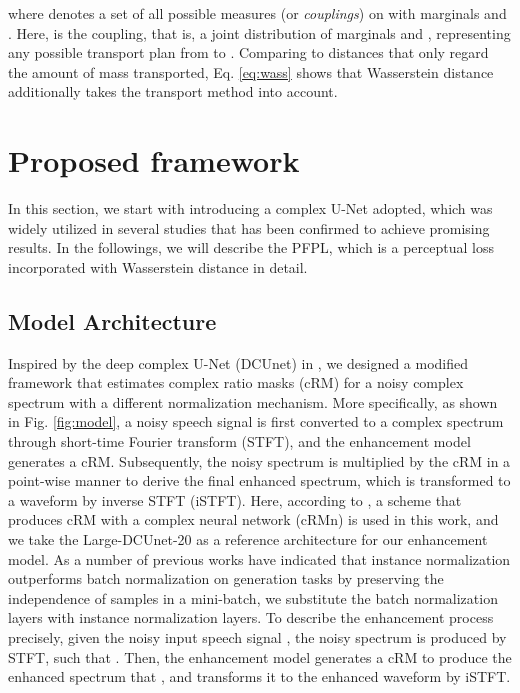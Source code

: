 \documentclass[a4paper]{article}
\begin{document}
where  denotes a set of all possible measures (or {\it couplings}) on  with marginals  and . Here,  is the coupling, that is, a joint distribution of marginals  and , representing any possible transport plan from  to . Comparing to  distances that only regard the amount of mass transported, Eq. \eqref{eq:wass} shows that Wasserstein distance additionally takes the transport method into account. 
\section{Proposed framework}
\label{sec:proposedframework}
In this section, we start with introducing a complex U-Net adopted, which was widely utilized in several studies \cite{YaoA19coarse, hu2020dccrn, choi2018phase} that has been confirmed to achieve promising results. In the followings, we will describe the PFPL, which is a perceptual loss incorporated with Wasserstein distance in detail.

\subsection{Model Architecture}
\label{ssec:enhancement_model}

Inspired by the deep complex U-Net (DCUnet) in \cite{choi2018phase}, we designed a modified framework that estimates complex ratio masks (cRM) for a noisy complex spectrum with a different normalization mechanism. More specifically, as shown in Fig. \ref{fig:model}, a noisy speech signal is first converted to a complex spectrum through short-time Fourier transform (STFT), and the enhancement model generates a cRM. Subsequently, the noisy spectrum is multiplied by the cRM in a point-wise manner to derive the final enhanced spectrum, which is transformed to a waveform by inverse STFT (iSTFT). Here, according to \cite{choi2018phase}, a scheme that produces cRM with a complex neural network (cRMn) is used in this work, and we take the Large-DCUnet-20 as a reference architecture for our enhancement model. As a number of previous works \cite{ulyanov2016instance, conf/iccv/HuangB17} have indicated that instance normalization outperforms batch normalization on generation tasks by preserving the independence of samples in a mini-batch, we substitute the batch normalization layers with instance normalization layers. To describe the enhancement process precisely, given the noisy input speech signal , the noisy spectrum  is produced by STFT, such that . Then, the enhancement model generates a cRM  to produce the enhanced spectrum that , and transforms it to the enhanced waveform  by iSTFT.
\end{document}
